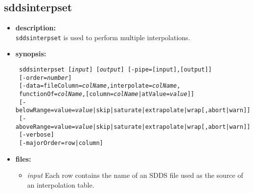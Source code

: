 \newpage 
\subsection{sddsinterpset} 
\label{sddsinterpset} 
 
\begin{itemize} 
\item {\bf description:} \hspace*{1mm}\\ 
{\tt sddsinterpset} is used to perform multiple interpolations.

\item {\bf synopsis:}  
\begin{flushleft}
{\tt 
sddsinterpset [{\em input}] [{\em output}] [-pipe=[input],[output]] \\ \
[-order={\em number}] \\ \
[-data=fileColumn={\em colName},interpolate={\em colName}, \\ \
 functionOf={\em colName},[column={\em colName}|atValue={\em value}]] \\ \
[-belowRange={value={\em value}|skip|saturate|extrapolate|wrap}[,{abort|warn}]] \\ \
[-aboveRange={value={\em value}|skip|saturate|extrapolate|wrap}[,{abort|warn}]] \\ \
[-verbose] \\ \
[-majorOrder=row|column]}
\end{flushleft} 

\item {\bf files:}
    \begin{itemize} 
    \item {\em input} Each row contains the name of an SDDS file used as the source of an interpolation table.
    \end{itemize} 


\end{itemize}

